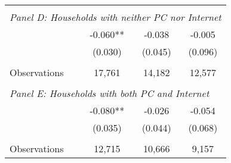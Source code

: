 {\begin{tabular}{lccc}
&  &  &   \\
\multicolumn{4}{l}{\textit{Panel D: Households with neither PC nor Internet}} \\
\hspace{3mm}        &      -0.060** &      -0.038   &      -0.005   \\
                    &     (0.030)   &     (0.045)   &     (0.096)   \\
                    &               &               &               \\
\hspace{3mm}Observations&      17,761   &      14,182   &      12,577   \\
 
&  &  &   \\
\multicolumn{4}{l}{\textit{Panel E: Households with both PC and Internet}} \\
\hspace{3mm}        &      -0.080** &      -0.026   &      -0.054   \\
                    &     (0.035)   &     (0.044)   &     (0.068)   \\
                    &               &               &               \\
\hspace{3mm}Observations&      12,715   &      10,666   &       9,157   \\
 

\bottomrule
\end{tabular}
}
